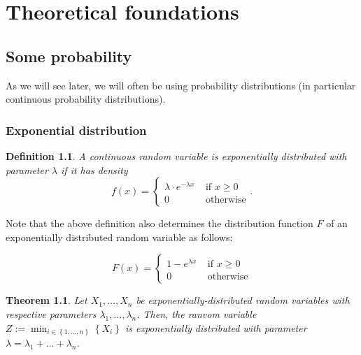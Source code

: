 \documentclass[letter]{report}
\newtheorem{definition}{Definition}[chapter]
\newtheorem{theorem}{Theorem}[chapter]
\begin{document}
\chapter{Theoretical foundations}
\label{chap:theoretical-foundations}

\section{Some probability}
\label{sec:some-probability}

As we will see later, we will often be using probability distributions (in particular continuous probability distributions).

\subsection{Exponential distribution}
\label{sec:exponential-distribution}

\begin{definition}
  A continuous random variable is \emph{exponentially distributed} with parameter $\lambda$ if it has density 
  \begin{equation*}
    f(x) =
    \begin{cases}
      \lambda \cdot e^{-\lambda x} & \text{ if } x \geq 0 
      \\ 0 & \text{ otherwise}
    \end{cases}
    .
  \end{equation*}
\end{definition}

Note that the above definition also determines the distribution function $F$ of an exponentially distributed random variable as follows:

\begin{equation*}
  F(x) =
  \begin{cases}
    1-e^{\lambda x} & \text{ if } x \geq 0 \\
    0 & \text{ otherwise}
  \end{cases}
\end{equation*}

\begin{theorem}
  Let $X_1,\dots,X_n$ be exponentially-distributed random variables with respective parameters $\lambda_1,\dots,\lambda_n$. Then, the ranvom variable $Z:=\min_{i\in\left\{ 1,\dots,n \right\}} \left\{ X_i \right\}$ is exponentially distributed with parameter $\lambda=\lambda_1+\dots+\lambda_n$.
\end{theorem}
\end{document}
